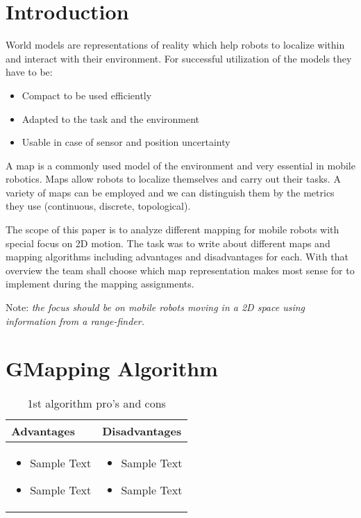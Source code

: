 \documentclass[12pt, a4paper, onecolumn]{article}
\begin{document}
\maketitle

\section{Introduction}
World models are representations of reality which help robots to localize within and interact with their environment. For successful utilization of the models they have to be:
\begin{itemize}
  \item Compact to be used efficiently
  \item Adapted to the task and the environment
  \item Usable in case of sensor and position uncertainty
  \end{itemize}
A map is a commonly used model of the environment and very essential in mobile robotics. Maps allow robots to localize themselves and carry out their tasks. A variety of maps can be employed and we can distinguish them by the metrics they use (continuous, discrete, topological).\par
The scope of this paper is to analyze different mapping for mobile robots with special focus on 2D motion. The task was to write about different maps and mapping algorithms including advantages and disadvantages for each. With that overview the team shall choose which map representation makes most sense for to implement during the mapping assignments. \par
Note: \emph{the focus should be on mobile robots moving in a 2D space using information from a range-finder.}

\section{GMapping Algorithm}
\lipsum[1]
\begin{table}[h!]
\centering
\begin{tabular}{ |p{7cm}||p{7cm}|  }
 \hline
 Advantages&Disadvantages\\
 \hline
\begin{itemize}
  \item Sample Text
  \item Sample Text
  \end{itemize} 
  & 
  \begin{itemize}
  \item Sample Text
  \item Sample Text
  \end{itemize} \\

 \hline
\end{tabular}
\caption{1st algorithm pro's and cons }
\label{table:1}
\end{table}
\end{document}
